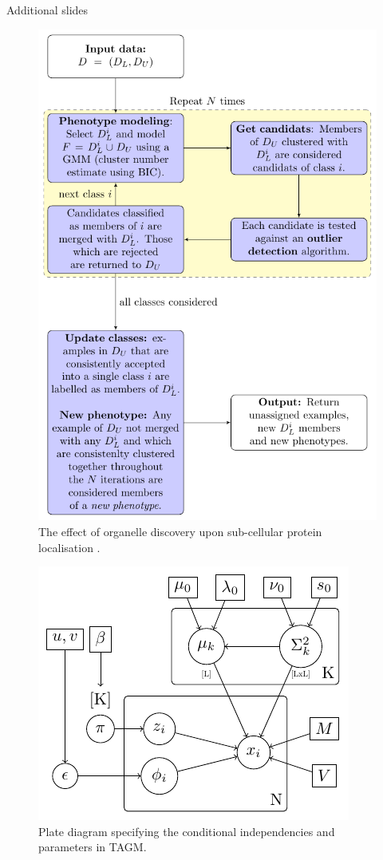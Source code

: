 \begin{frame}{}
  Additional slides
\end{frame}

\begin{frame}{}
  \begin{figure}
    \includegraphics[width=.48\linewidth]{figs_more/phenodisco.pdf}
    \caption{The effect of organelle discovery upon sub-cellular protein
      localisation \cite{Breckels:2013}.}
  \end{figure}
\end{frame}


\begin{frame}{}
  \begin{figure}
    \includegraphics[width=.9\linewidth]{./figs_more/graphmodel2.pdf}
    \caption{Plate diagram specifying the conditional independencies
      and parameters in TAGM.}
  \end{figure}
\end{frame}
